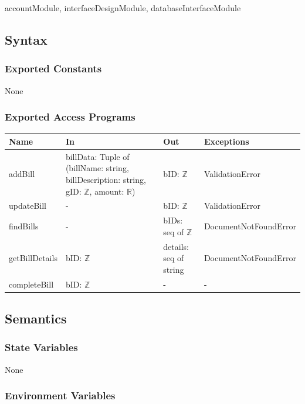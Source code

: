 \documentclass[12pt, titlepage]{article}
\begin{document}
accountModule, interfaceDesignModule, databaseInterfaceModule

\subsection{Syntax}

\subsubsection{Exported Constants}

None

\subsubsection{Exported Access Programs}

\begin{center}
\begin{tabular}{p{3cm} p{5cm} p{2cm} p{4cm}}
\hline
\textbf{Name} & \textbf{In} & \textbf{Out} & \textbf{Exceptions} \\
\hline
addBill & billData: Tuple of (billName: string, billDescription: string, gID: $\mathbb{Z}$, amount: $\mathbb{R}$) & bID:  $\mathbb{Z}$ & ValidationError \\
\hline
updateBill & - & bID: $\mathbb{Z}$ & ValidationError \\
\hline
findBills & - & bIDs: seq of $\mathbb{Z}$ & DocumentNotFoundError\\
\hline
getBillDetails & bID: $\mathbb{Z}$ & details: seq of string & DocumentNotFoundError \\
\hline
completeBill & bID: $\mathbb{Z}$ & - & - \\
\hline
\end{tabular}
\end{center}

\subsection{Semantics}

\subsubsection{State Variables}

None


\subsubsection{Environment Variables}
\end{document}
